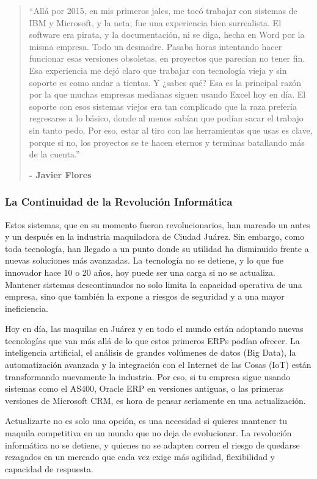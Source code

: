 \documentclass[
  letterpaper,
]{book}
\begin{document}
\begin{quote}
``Allá por 2015, en mis primeros jales, me tocó trabajar con sistemas de
IBM y Microsoft, y la neta, fue una experiencia bien surrealista. El
software era pirata, y la documentación, ni se diga, hecha en Word por
la misma empresa. Todo un desmadre. Pasaba horas intentando hacer
funcionar esas versiones obsoletas, en proyectos que parecían no tener
fin. Esa experiencia me dejó claro que trabajar con tecnología vieja y
sin soporte es como andar a tientas. Y ¿sabes qué? Esa es la principal
razón por la que muchas empresas medianas siguen usando Excel hoy en
día. El soporte con esos sistemas viejos era tan complicado que la raza
prefería regresarse a lo básico, donde al menos sabían que podían sacar
el trabajo sin tanto pedo. Por eso, estar al tiro con las herramientas
que usas es clave, porque si no, los proyectos se te hacen eternos y
terminas batallando más de la cuenta.''

\textbf{- Javier Flores}
\end{quote}

\subsubsection{La Continuidad de la Revolución
Informática}\label{la-continuidad-de-la-revoluciuxf3n-informuxe1tica}

Estos sistemas, que en su momento fueron revolucionarios, han marcado un
antes y un después en la industria maquiladora de Ciudad Juárez. Sin
embargo, como toda tecnología, han llegado a un punto donde su utilidad
ha disminuido frente a nuevas soluciones más avanzadas. La tecnología no
se detiene, y lo que fue innovador hace 10 o 20 años, hoy puede ser una
carga si no se actualiza. Mantener sistemas descontinuados no solo
limita la capacidad operativa de una empresa, sino que también la expone
a riesgos de seguridad y a una mayor ineficiencia.

Hoy en día, las maquilas en Juárez y en todo el mundo están adoptando
nuevas tecnologías que van más allá de lo que estos primeros ERPs podían
ofrecer. La inteligencia artificial, el análisis de grandes volúmenes de
datos (Big Data), la automatización avanzada y la integración con el
Internet de las Cosas (IoT) están transformando nuevamente la industria.
Por eso, si tu empresa sigue usando sistemas como el AS400, Oracle ERP
en versiones antiguas, o las primeras versiones de Microsoft CRM, es
hora de pensar seriamente en una actualización.

Actualizarte no es solo una opción, es una necesidad si quieres mantener
tu maquila competitiva en un mundo que no deja de evolucionar. La
revolución informática no se detiene, y quienes no se adapten corren el
riesgo de quedarse rezagados en un mercado que cada vez exige más
agilidad, flexibilidad y capacidad de respuesta.
\end{document}
